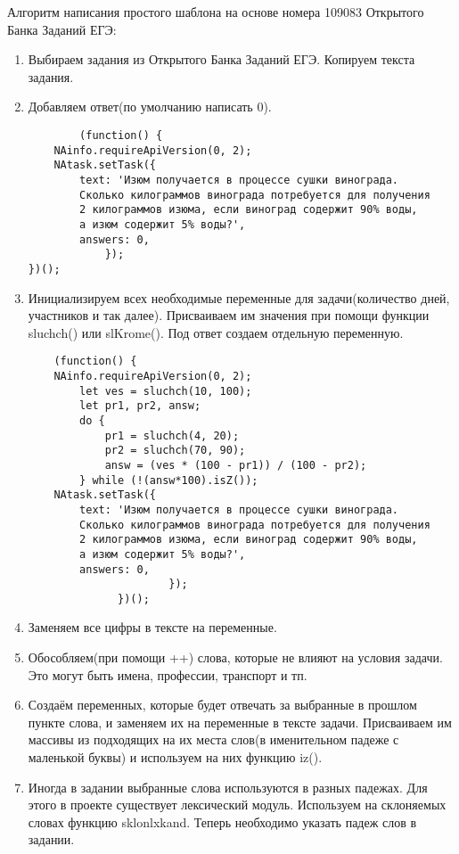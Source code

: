 Алгоритм написания простого шаблона на основе номера 109083 Открытого Банка Заданий ЕГЭ:%
\begin{enumerate}
    \item Выбираем задания из Открытого Банка Заданий ЕГЭ. Копируем текста задания.
    \item Добавляем ответ(по умолчанию написать 0).
          \begin{verbatim}
        (function() {
	NAinfo.requireApiVersion(0, 2);
    NAtask.setTask({
        text: 'Изюм получается в процессе сушки винограда. 
        Сколько килограммов винограда потребуется для получения 
        2 килограммов изюма, если виноград содержит 90% воды,
        а изюм содержит 5% воды?',
        answers: 0,
            });
})();
        \end{verbatim}
    \item Инициализируем всех необходимые переменные для задачи(количество дней, участников и так далее). Присваиваем им значения при помощи функции sluchch() или slKrome(). Под ответ создаем отдельную переменную.
          \begin{verbatim}     
    (function() {
    NAinfo.requireApiVersion(0, 2);
        let ves = sluchch(10, 100);
        let pr1, pr2, answ;
        do {
            pr1 = sluchch(4, 20);
            pr2 = sluchch(70, 90);
            answ = (ves * (100 - pr1)) / (100 - pr2);
        } while (!(answ*100).isZ());
    NAtask.setTask({
        text: 'Изюм получается в процессе сушки винограда.
        Сколько килограммов винограда потребуется для получения
        2 килограммов изюма, если виноград содержит 90% воды,
        а изюм содержит 5% воды?',
        answers: 0,
                      });
              })();
            \end{verbatim}
    \item Заменяем все цифры в тексте на переменные.
    \item Обособляем(при помощи ++) слова, которые не влияют на условия задачи. Это могут быть имена, профессии, транспорт и тп.
    \item Создаём переменных, которые будет отвечать за выбранные в прошлом пункте слова, и заменяем их на переменные в тексте задачи.
          Присваиваем им массивы из подходящих на их места слов(в именительном падеже с маленькой буквы) и используем на них функцию iz().
    \item Иногда в задании выбранные слова используются в разных падежах. Для этого в проекте существует лексический модуль. Используем на склоняемых словах функцию sklonlxkand. Теперь необходимо указать падеж слов в задании.

\end{enumerate}
